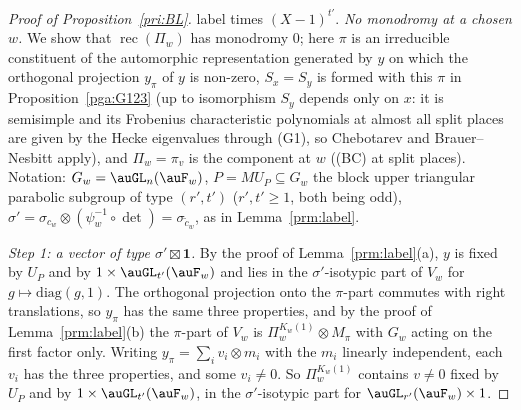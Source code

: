 \documentclass[10pt]{amsart}
\theoremstyle{definition}
\theoremstyle{remark}
\begin{document}
\begin{proof}[Proof of Proposition~\ref{pri:BL}]
label times $(X-1)^{t'}$.
\emph{No monodromy at a chosen $w$.} We show that $\operatorname{rec}(\Pi_w)$ has monodromy $0$;
here $\pi$ is an irreducible constituent of the automorphic representation generated by $y$ on
which the orthogonal projection $y_\pi$ of $y$ is non-zero, $S_x=S_y$ is formed with this $\pi$ in
Proposition~\ref{pga:G123} (up to isomorphism $S_y$ depends only on $x$: it is semisimple and its
Frobenius characteristic polynomials at almost all split places are given by the Hecke eigenvalues
through (G1), so Chebotarev and Brauer--Nesbitt apply), and $\Pi_w=\pi_v$ is the component at $w$
((BC) at split places). Notation: $G_w=\auGL_n(\auF_w)$, $P=MU_P\subseteq G_w$ the block upper
triangular parabolic subgroup of type $(r',t')$ ($r',t'\ge1$, both being odd), $\sigma'=\sigma_{c_w}
\otimes(\psi_w^{-1}\circ\det)=\sigma_{\tilde c_w}$, as in Lemma~\ref{prm:label}.

\emph{Step 1: a vector of type $\sigma'\boxtimes\mathbf 1$.} By the proof of Lemma~\ref{prm:label}(a),
$y$ is fixed by $U_P$ and by $1\times\auGL_{t'}(\auF_w)$ and lies in the $\sigma'$-isotypic part of
$V_w$ for $g\mapsto\mathrm{diag}(g,1)$. The orthogonal projection onto the $\pi$-part commutes with
right translations, so $y_\pi$ has the same three properties, and by the proof of
Lemma~\ref{prm:label}(b) the $\pi$-part of $V_w$ is $\Pi_w^{K_w(1)}\otimes M_\pi$ with $G_w$ acting on
the first factor only. Writing $y_\pi=\sum_iv_i\otimes m_i$ with the $m_i$ linearly independent, each
$v_i$ has the three properties, and some $v_i\ne0$. So $\Pi_w^{K_w(1)}$ contains $v\ne0$ fixed by
$U_P$ and by $1\times\auGL_{t'}(\auF_w)$, in the $\sigma'$-isotypic part for $\auGL_{r'}(\auF_w)\times1$.


\end{proof}
\end{document}
